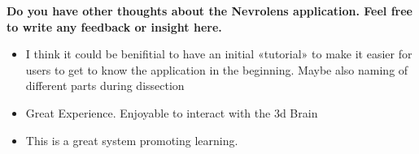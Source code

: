 {\small
\noindent
\textbf{Do you have other thoughts about the Nevrolens application. Feel free to write any feedback or insight here.}
\begin{itemize}[]
    \itshape\footnotesize
    \item I think it could be benifitial to have an initial «tutorial» to make it easier for users to get to know the application in the beginning. Maybe also naming of different parts during dissection
    \item Great Experience. Enjoyable to interact with the 3d Brain
    \item This is a great system promoting learning.


\end{itemize}
}
